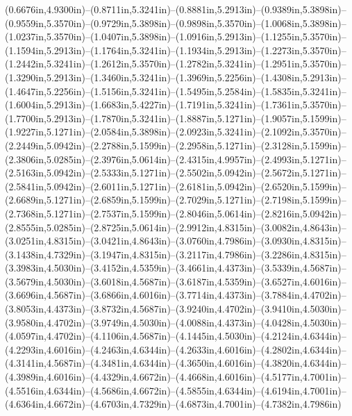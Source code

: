 (0.6676in,4.9300in)--(0.8711in,5.3241in)--(0.8881in,5.2913in)--(0.9389in,5.3898in)--(0.9559in,5.3570in)--(0.9729in,5.3898in)--(0.9898in,5.3570in)--(1.0068in,5.3898in)--(1.0237in,5.3570in)--(1.0407in,5.3898in)--(1.0916in,5.2913in)--(1.1255in,5.3570in)--(1.1594in,5.2913in)--(1.1764in,5.3241in)--(1.1934in,5.2913in)--(1.2273in,5.3570in)--(1.2442in,5.3241in)--(1.2612in,5.3570in)--(1.2782in,5.3241in)--(1.2951in,5.3570in)--(1.3290in,5.2913in)--(1.3460in,5.3241in)--(1.3969in,5.2256in)--(1.4308in,5.2913in)--(1.4647in,5.2256in)--(1.5156in,5.3241in)--(1.5495in,5.2584in)--(1.5835in,5.3241in)--(1.6004in,5.2913in)--(1.6683in,5.4227in)--(1.7191in,5.3241in)--(1.7361in,5.3570in)--(1.7700in,5.2913in)--(1.7870in,5.3241in)--(1.8887in,5.1271in)--(1.9057in,5.1599in)--(1.9227in,5.1271in)--(2.0584in,5.3898in)--(2.0923in,5.3241in)--(2.1092in,5.3570in)--(2.2449in,5.0942in)--(2.2788in,5.1599in)--(2.2958in,5.1271in)--(2.3128in,5.1599in)--(2.3806in,5.0285in)--(2.3976in,5.0614in)--(2.4315in,4.9957in)--(2.4993in,5.1271in)--(2.5163in,5.0942in)--(2.5333in,5.1271in)--(2.5502in,5.0942in)--(2.5672in,5.1271in)--(2.5841in,5.0942in)--(2.6011in,5.1271in)--(2.6181in,5.0942in)--(2.6520in,5.1599in)--(2.6689in,5.1271in)--(2.6859in,5.1599in)--(2.7029in,5.1271in)--(2.7198in,5.1599in)--(2.7368in,5.1271in)--(2.7537in,5.1599in)--(2.8046in,5.0614in)--(2.8216in,5.0942in)--(2.8555in,5.0285in)--(2.8725in,5.0614in)--(2.9912in,4.8315in)--(3.0082in,4.8643in)--(3.0251in,4.8315in)--(3.0421in,4.8643in)--(3.0760in,4.7986in)--(3.0930in,4.8315in)--(3.1438in,4.7329in)--(3.1947in,4.8315in)--(3.2117in,4.7986in)--(3.2286in,4.8315in)--(3.3983in,4.5030in)--(3.4152in,4.5359in)--(3.4661in,4.4373in)--(3.5339in,4.5687in)--(3.5679in,4.5030in)--(3.6018in,4.5687in)--(3.6187in,4.5359in)--(3.6527in,4.6016in)--(3.6696in,4.5687in)--(3.6866in,4.6016in)--(3.7714in,4.4373in)--(3.7884in,4.4702in)--(3.8053in,4.4373in)--(3.8732in,4.5687in)--(3.9240in,4.4702in)--(3.9410in,4.5030in)--(3.9580in,4.4702in)--(3.9749in,4.5030in)--(4.0088in,4.4373in)--(4.0428in,4.5030in)--(4.0597in,4.4702in)--(4.1106in,4.5687in)--(4.1445in,4.5030in)--(4.2124in,4.6344in)--(4.2293in,4.6016in)--(4.2463in,4.6344in)--(4.2633in,4.6016in)--(4.2802in,4.6344in)--(4.3141in,4.5687in)--(4.3481in,4.6344in)--(4.3650in,4.6016in)--(4.3820in,4.6344in)--(4.3989in,4.6016in)--(4.4329in,4.6672in)--(4.4668in,4.6016in)--(4.5177in,4.7001in)--(4.5516in,4.6344in)--(4.5686in,4.6672in)--(4.5855in,4.6344in)--(4.6194in,4.7001in)--(4.6364in,4.6672in)--(4.6703in,4.7329in)--(4.6873in,4.7001in)--(4.7382in,4.7986in) 